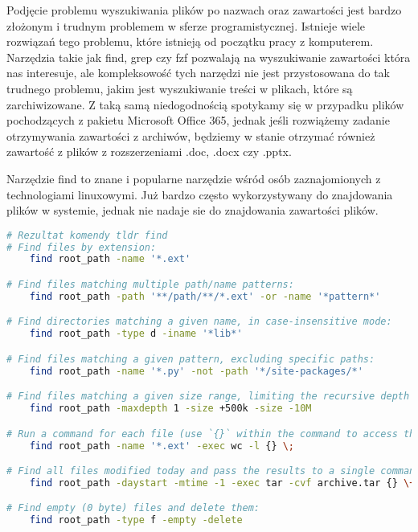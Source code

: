 Podjęcie problemu wyszukiwania plików po nazwach oraz zawartości jest bardzo
złożonym i trudnym problemem w sferze programistycznej. Istnieje wiele rozwiązań
tego problemu, które istnieją od początku pracy z komputerem. Narzędzia takie
jak find, grep czy fzf pozwalają na wyszukiwanie zawartości która nas interesuje,
ale kompleksowość tych narzędzi nie jest przystosowana do tak trudnego problemu,
jakim jest wyszukiwanie treści w plikach, które są zarchiwizowane. Z taką samą
niedogodnością spotykamy się w przypadku plików pochodzących z pakietu Microsoft
Office 365, jednak jeśli rozwiążemy zadanie otrzymywania zawartości z archiwów,
będziemy w stanie otrzymać również zawartość z plików z rozszerzeniami .doc,
.docx czy .pptx.

Narzędzie find to znane i popularne narzędzie wśród osób zaznajomionych z
technologiami linuxowymi. Już bardzo często wykorzystywany do znajdowania plików
w systemie, jednak nie nadaje sie do znajdowania zawartości plików.

\begin{lstlisting}[language=bash]
# Rezultat komendy tldr find
# Find files by extension:
    find root_path -name '*.ext'

# Find files matching multiple path/name patterns:
    find root_path -path '**/path/**/*.ext' -or -name '*pattern*'

# Find directories matching a given name, in case-insensitive mode:
    find root_path -type d -iname '*lib*'

# Find files matching a given pattern, excluding specific paths:
    find root_path -name '*.py' -not -path '*/site-packages/*'

# Find files matching a given size range, limiting the recursive depth to "1":
    find root_path -maxdepth 1 -size +500k -size -10M

# Run a command for each file (use `{}` within the command to access the filename):
    find root_path -name '*.ext' -exec wc -l {} \;

# Find all files modified today and pass the results to a single command as arguments:
    find root_path -daystart -mtime -1 -exec tar -cvf archive.tar {} \+

# Find empty (0 byte) files and delete them:
    find root_path -type f -empty -delete
\end{lstlisting}

